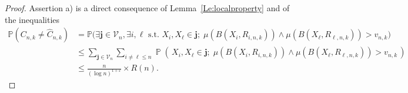 \documentclass{article}
\theoremstyle{thm}
\theoremstyle{definition}
\newcommand{\EEE}[1]{\operatorname{\mathbb{E}}\left[\,#1\,\right]}
\theoremstyle{definition}
\theoremstyle{def}
\newcommand{\PP}{\mathbb{P}} %
\newcommand{\jj}{\mathbf{j}}
\newcommand{\VV}{\mathcal{V}_n}
\newcommand{\PPP}[1]{\operatorname{\mathbb{P}}\left(\,#1\,\right)}
\newcommand{\conv}[2][n]{\underset{#1\rightarrow #2}{\longrightarrow}}
\begin{document}



\begin{proof}
Assertion a) is a direct consequence of Lemma~\ref{Le:localproperty}  and of the inequalities
\begin{align*}
\PP(C_{n,k}\neq \widehat{C}_{n,k})  & = \PP \big(\exists \jj\in\VV, \exists i,\ell \text{ s.t. } X_i,X_\ell \in \jj;\; \mu(B(X_i,R_{i,n,k})) \wedge \mu(B(X_{\ell},R_{\ell,n,k}))>v_{n,k} \big)\\
& \leq \sum_{\jj\in \VV}\sum_{i\neq \ell \leq n}\PPP{X_i,X_{\ell}\in \jj;\; \mu(B(X_i,R_{i,n,k})) \wedge \mu(B(X_{\ell},R_{\ell,n,k}))>v_{n,k} }\\
& \leq \frac{n}{(\log n)^{1+\varepsilon}}\times R(n).
\end{align*}

\bigskip


\end{proof}
\end{document}
